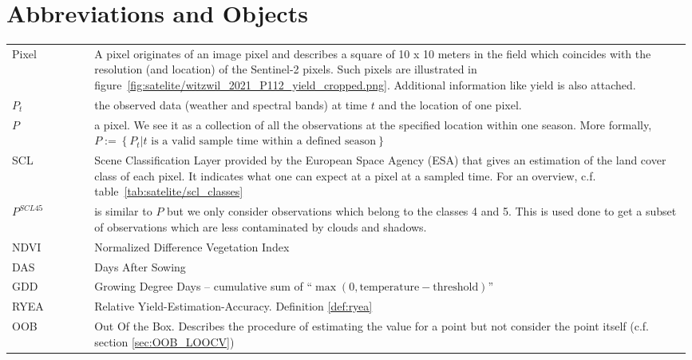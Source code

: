 \section*{Abbreviations and Objects}
\begin{longtable}{p{0.12\linewidth} p{0.87\linewidth}}
Pixel	
		& A pixel originates of an image pixel and describes a square of 10 x 10 meters in the field which coincides with the resolution (and location) of the Sentinel-2 pixels. Such pixels are illustrated in figure~\ref{fig:satelite/witzwil_2021_P112_yield_cropped.png}. Additional information like yield is also attached.\\

$P_t$	
		& the observed data (weather and spectral bands) at time $t$ and the location of one pixel. \\

$P$	
		& a pixel. We see it as a collection of all the observations at the specified location within one season. More formally, $P := \left\{P_t | t\text{ is a valid sample time within a defined season}\right\}$\\

SCL	
		& Scene Classification Layer provided by the European Space Agency (ESA) that gives an estimation of the land cover class of each pixel. It indicates what one can expect at a pixel at a sampled time. For an overview, c.f. table~\ref{tab:satelite/scl_classes}\\

$P^{SCL45}$	
		& is similar to $P$ but we only consider observations which belong to the classes 4 and 5. This is used done to get a subset of observations which are less contaminated by clouds and shadows.\\

NDVI	
		& Normalized Difference Vegetation Index \citep{rouseMonitoringVernalAdvancement1974}\\

DAS	
		& Days After Sowing\\

GDD	
		& Growing Degree Days -- cumulative sum of ``$\max(0, \text{temperature}-\text{threshold})$''\\

RYEA 	
		& Relative Yield-Estimation-Accuracy. Definition \ref{def:ryea}\\

OOB 	
		& Out Of the Box. Describes the procedure of  estimating the value for a point but not consider the point itself (c.f. section \ref{sec:OOB_LOOCV})\\
\end{longtable} 

